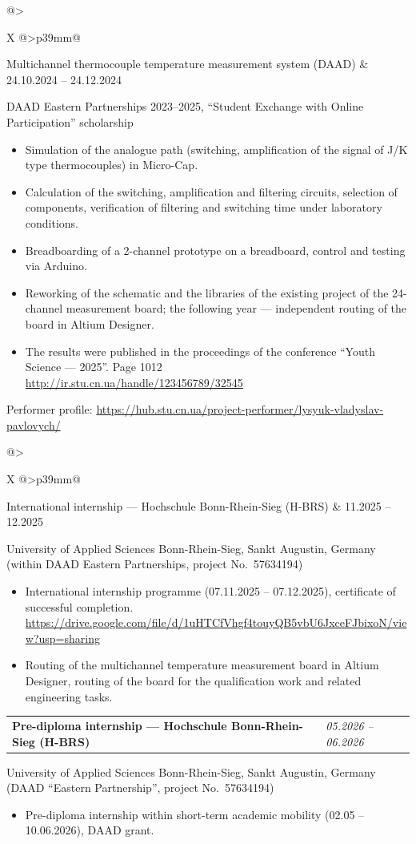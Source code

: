 \documentclass[11pt,a4paper]{article}
\makeatletter
\newcommand{\entry}[2]{%
  \par\vspace{5pt}%
  \noindent\begin{tabularx}{\linewidth}{@{}>{\raggedright\arraybackslash\bfseries}X @{\hspace{8pt}}>{\raggedleft\arraybackslash\itshape}p{39mm}@{}}
    #1 & #2
  \end{tabularx}%
  \par\vspace{1pt}%
}
\newcommand{\org}[1]{{\itshape\raggedright #1\par}\vspace{2pt}}
\newenvironment{points}
  {\begin{itemize}[leftmargin=14pt, itemsep=1.5pt, topsep=2pt, parsep=0pt,
                   label=\textbullet]}
  {\end{itemize}}
\newcommand{\note}[1]{\vspace{2pt}#1\par}
\makeatother
\begin{document}
\entry{Multichannel thermocouple temperature measurement system (DAAD)}{24.10.2024 -- 24.12.2024}
\org{DAAD Eastern Partnerships 2023--2025, “Student Exchange with Online Participation” scholarship}
\begin{points}
  \item Simulation of the analogue path (switching, amplification of the signal of J/K type
        thermocouples) in Micro-Cap.
  \item Calculation of the switching, amplification and filtering circuits, selection of components,
        verification of filtering and switching time under laboratory conditions.
  \item Breadboarding of a 2-channel prototype on a breadboard, control and testing via Arduino.
  \item Reworking of the schematic and the libraries of the existing project of the 24-channel
        measurement board; the following year --- independent routing of the board in Altium Designer.
  \item The results were published in the proceedings of the conference “Youth Science --- 2025”. Page 1012\\
        \url{http://ir.stu.cn.ua/handle/123456789/32545}
\end{points}
\note{Performer profile: \url{https://hub.stu.cn.ua/project-performer/lysyuk-vladyslav-pavlovych/}}

\entry{International internship --- Hochschule Bonn-Rhein-Sieg (H-BRS)}{11.2025 -- 12.2025}
\org{University of Applied Sciences Bonn-Rhein-Sieg, Sankt Augustin, Germany (within DAAD Eastern Partnerships, project No.~57634194)}
\begin{points}
  \item International internship programme (07.11.2025 -- 07.12.2025), certificate of successful completion.\\
        \url{https://drive.google.com/file/d/1uHTCfVhgf4touyQB5vbU6JxceFJbixoN/view?usp=sharing}
  \item Routing of the multichannel temperature measurement board in Altium Designer, routing of
        the board for the qualification work and related engineering tasks.
\end{points}

\entry{Pre-diploma internship --- Hochschule Bonn-Rhein-Sieg (H-BRS)}{05.2026 -- 06.2026}
\org{University of Applied Sciences Bonn-Rhein-Sieg, Sankt Augustin, Germany (DAAD “Eastern Partnership”, project No.~57634194)}
\begin{points}
  \item Pre-diploma internship within short-term academic mobility (02.05 -- 10.06.2026), DAAD grant.
\end{points}
\end{document}
